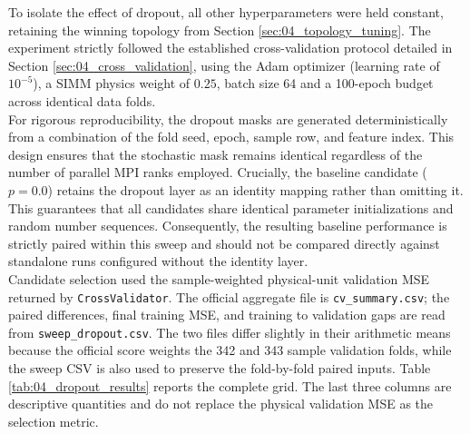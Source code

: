 To isolate the effect of dropout, all other hyperparameters were held constant, retaining the winning topology from Section \ref{sec:04_topology_tuning}. The experiment strictly followed the established cross-validation protocol detailed in Section \ref{sec:04_cross_validation}, using the Adam optimizer (learning rate of $10^{-5}$), a SIMM physics weight of $0.25$, batch size 64 and a 100-epoch budget across identical data folds.\\

For rigorous reproducibility, the dropout masks are generated deterministically from a combination of the fold seed, epoch, sample row, and feature index. This design ensures that the stochastic mask remains identical regardless of the number of parallel MPI ranks employed. Crucially, the baseline candidate ($p = 0.0$) retains the dropout layer as an identity mapping rather than omitting it. This guarantees that all candidates share identical parameter initializations and random number sequences. Consequently, the resulting baseline performance is strictly paired within this sweep and should not be compared directly against standalone runs configured without the identity layer.\\

Candidate selection used the sample-weighted physical-unit validation MSE returned by \texttt{CrossValidator}. The official aggregate file is \texttt{cv\_summary.csv}; the paired differences, final training MSE, and training to validation gaps are read from \texttt{sweep\_dropout.csv}. The two files differ slightly in their arithmetic means because the official score weights the 342 and 343 sample validation folds, while the sweep CSV is also used to preserve the fold-by-fold paired inputs. Table \ref{tab:04_dropout_results} reports the complete grid. The last three columns are descriptive quantities and do not replace the physical validation MSE as the selection metric.\\

